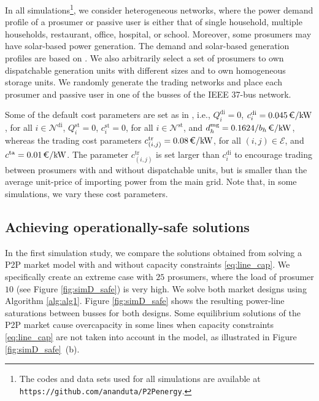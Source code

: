 \documentclass{IEEEtran}  %
\newcommand{\mc}{\mathcal}
\newcommand{\0}{\mathbf{0}}
\newcommand{\1}{\mathbf{1}}
\begin{document}
In all simulations\footnote{The codes and data sets used for all simulations are available at \texttt{https://github.com/ananduta/P2Penergy}.}, we consider heterogeneous networks, where the power demand profile of a prosumer or passive user is either that of single household, multiple households, restaurant, office, hospital, or school. Moreover, some prosumers may have solar-based power generation. The demand and solar-based generation profiles are based on \cite{jasm}.
%
We also arbitrarily select a set of prosumers to own dispatchable generation units with different sizes and to own homogeneous storage units. We randomly generate the trading networks and place each prosumer and passive user in one of the busses of the IEEE 37-bus network. 

Some of the default cost parameters are set as in \cite{atzeni2013}, i.e., $Q_i^{\mathrm{di}}=0$, $c_i^{\mathrm{di}}=0.045\,  \text{\euro/kW}$, for all $i \in \mc N^{\mathrm{di}}$, $Q_i^{\mathrm{st}}=0$, $c_i^{\mathrm{st}}=0$, for all $i \in \mc N^{\mathrm{st}}$, and $d_h^{\mathrm{mg}}=0.1624/b_h \, \text{\euro/kW}$, whereas the trading cost parameters $c_{(i,j)}^{\mathrm{tr}}=0.08 \,  \text{\euro/kW}$, for all $(i,j) \in \mc E$, and $c^{\mathrm{ta}}=0.01 \,  \text{\euro/kW}$. The parameter $c_{(i,j)}^{\mathrm{tr}}$ is set larger than $c_i^{\mathrm{di}}$ to encourage trading between prosumers with and without dispatchable units, but is smaller than the average unit-price of importing power from the main grid. Note that, in some simulations, we vary these cost parameters. 
%
%
\subsection{Achieving operationally-safe solutions}
In the first simulation study, we compare the solutions obtained from solving a P2P market model with and without capacity constraints \eqref{eq:line_cap}. We specifically create an extreme case with $25$ prosumers, where the load of  prosumer $10$ (see Figure \ref{fig:simD_safe}) is very high. We solve both market designs using Algorithm \ref{alg:alg1}. Figure \ref{fig:simD_safe} shows the resulting power-line saturations between busses for both designs. 
%
Some equilibrium solutions of the P2P market cause overcapacity in some lines when capacity constraints \eqref{eq:line_cap} are not taken into account in the model, as illustrated in Figure \ref{fig:simD_safe}~(b).
\end{document}
